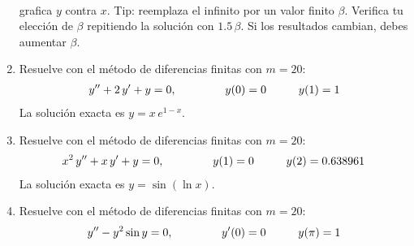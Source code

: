 \begin{enumerate}
\begin{align*}
\end{align*}
grafica $y$ contra $x$. Tip: reemplaza el infinito por un valor finito $\beta$. Verifica tu elección de $\beta$ repitiendo la solución con $1.5 \, \beta$. Si los resultados cambian, debes aumentar $\beta$.
\item Resuelve con el método de diferencias finitas con $m = 20$:
\begin{align*}
{y}^{\prime \prime} + 2 \, {y}^{\prime} + y = 0, \hspace{1.5cm} y (0) = 0 \hspace{1cm} y (1) = 1
\end{align*}
La solución exacta es $y = x \, e^{1-x}$.
\item Resuelve con el método de diferencias finitas con $m = 20$:
\begin{align*}
x^{2} \, {y}^{\prime \prime} + x \, {y}^{\prime} + y = 0, \hspace{1.5cm} y (1) = 0 \hspace{1cm} y (2) = 0.638961
\end{align*}
La solución exacta es $y = \sin(\ln x)$.
\item Resuelve con el método de diferencias finitas con $m = 20$:
\begin{align*}
{y}^{\prime \prime} - y^{2} \sin y = 0, \hspace{1.5cm} {y}^{\prime} (0) = 0 \hspace{1cm} y (\pi) = 1
\end{align*}
\end{enumerate}

